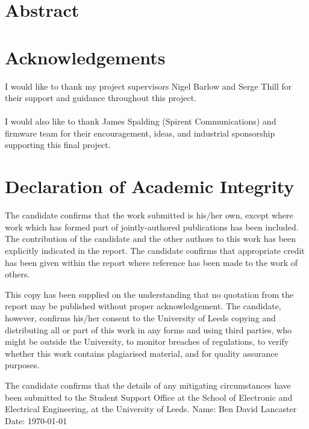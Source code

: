 \documentclass[11pt,a4paper,twoside]{report}
\begin{document}
\newpage
\chapter*{Abstract}
\lipsum[1-3]

\newpage
\chapter*{Acknowledgements}
I would like to thank my project supervisors Nigel Barlow and Serge Thill for their support and guidance throughout this project. 
\\\\
I would also like to thank James Spalding (Spirent Communications) and firmware team for their encouragement, ideas, and industrial sponsorship supporting this final project.



\chapter*{Declaration of Academic Integrity}

The candidate confirms that the work submitted is his/her own, except where work which has formed part of jointly-authored publications has been included. The contribution of the candidate and the other authors to this work has been explicitly indicated in the report. The candidate confirms that appropriate credit has been given within the report where reference has been made to the work of others.

This copy has been supplied on the understanding that no quotation from the report may be published without proper acknowledgement. The candidate, however, confirms his/her consent to the University of Leeds copying and distributing all or part of this work in any forms and using third parties, who might be outside the University, to monitor breaches of regulations, to verify whether this work contains plagiarised material, and for quality assurance purposes.

The candidate confirms that the details of any mitigating circumstances have been submitted to the Student Support Office at the School of Electronic and Electrical Engineering, at the University of Leeds.
\vfill
\noindent Name:	Ben David Lancaster \\
Date:	\today
\newpage


\newpage
\renewcommand*\contentsname{Table of Contents}
{%
\tableofcontents
}
\end{document}
